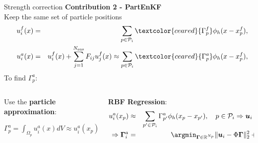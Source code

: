 \documentclass[aspectratio=169]{beamer} %
\begin{document}
\begin{frame}{Strength correction}
    \small
    \textbf{Contribution 2 - PartEnKF} \\
    Keep the same set of particle positions
    \begin{eqnarray*}
        u_i^f(x) &=& \sum_{p \in \mathcal P_i} \textcolor{ceared}{\Gamma^f_p} \phi_h(x - x_p^f),\\
        \quad u^a_i(x) &=& u_i^f(x) + \sum_{j=1}^{N_{\text{ens}}} F_{ij} u_j^f(x) \approx \sum_{p \in \mathcal P_i} \textcolor{ceared}{\Gamma^a_p} \phi_h(x - x_p^f), \\
    \end{eqnarray*}
    \vspace{-0.7cm}
    \normalsize To find $\Gamma^a_p$:
    \begin{columns}[t]
        \begin{column}{0.4\textwidth}
            Use the \textbf{particle approximation}: \\
            \vfill

            $\Gamma^a_p = \int_{\Omega_p} u^a_i(x) dV \approx u^a_i(x_p) V_p$

        \end{column}
        \hspace{-0.7cm}
        \begin{column}{0.6\textwidth}
            \textbf{RBF Regression}: \\
            \begin{eqnarray*}
                u^a_i(x_p) &\approx& \sum_{p' \in \mathcal P_i} \Gamma^a_{p'} \phi_h(x_p - x_{p'}), \quad p \in \mathcal P_i \Rightarrow \bm u_i \approx \Phi \bm \Gamma_i\\
                \Rightarrow \bm \Gamma_i^a &=& \argmin_{\bm \Gamma \in \mathbb R^{N_p}} \| \bm u_i - \Phi \bm \Gamma\|_2^2 + R(\bm \Gamma)
            \end{eqnarray*}
        \end{column}
    \end{columns}
\end{frame}
\end{document}
